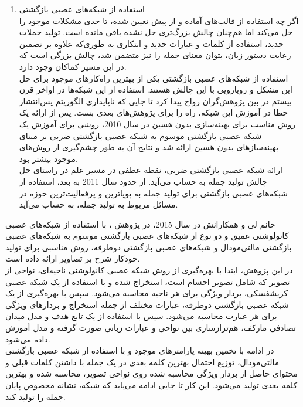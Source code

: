 \begin{enumerate}
\item استفاده از شبکه‌های عصبی بازگشتی
\\
اگر چه استفاده از قالب‌های آماده و از پیش تعیین شده، تا حدی مشکلات موجود را حل می‌کند اما هم‌چنان چالش بزرگ‌تری حل نشده باقی مانده است. تولید جملات جدید، استفاده از کلمات و عبارات جدید و ابتکاری به طوری‌که علاوه بر تضمین رعایت دستور زبان، بتوان معنای جمله را نیز متضمن شد، چالش بزرگی است که در این مسیر کماکان وجود دارد.
\\
استفاده از شبکه‌های عصبی بازگشتی یکی از بهترین راه‌کارهای موجود برای حل این مشکل و رویارویی با این چالش هستند. استفاده از این شبکه‌ها در اواخر قرن بیستم در بین پژوهش‌گران رواج پیدا کرد تا جایی که ناپایداری الگوریتم پس‌انتشار خطا در آموزش این شبکه، راه را برای پژوهش‌های بعدی بست. پس از ارائه یک روش مناسب برای بهینه‌سازی بدون هسین در سال 2010، روشی برای آموزش یک شبکه عصبی بازگشتی موسوم به شبکه عصبی بازگشتی ضربی بر مبنای بهینه‌سازهای بدون هسین ارائه شد و نتایج آن به طور چشم‌گیری از روش‌های موجود بیشتر بود.
\\
ارائه شبکه عصبی بازگشتی ضربی، نقطه عطفی در مسیر علم در راستای حل چالش تولید جمله به حساب می‌آید. از حدود سال 2011 به بعد، استفاده از شبکه‌های عصبی بازگشتی برای تولید جمله به پویاترین و پرفعالیت‌ترین حوزه در مسائل مربوط به تولید جمله، به حساب می‌آید.
\end{enumerate}

خانم لی و همکارانش در سال 2015، در پژوهش \cite{karpathy2015deep}، با استفاده از شبکه‌های عصبی کانولوشنی عمیق و دو نوع از شبکه‌های عصبی بازگشتی موسوم به شبکه‌های عصبی بازگشتی مالتی‌مودال و شبکه‌های عصبی بازگشتی دوطرفه، روش مناسبی برای تولید خودکار شرح بر تصاویر ارائه داده است.
\\
در این پژوهش، ابتدا با بهره‌گیری از روش شبکه عصبی کانولوشنی ناحیه‌ای، نواحی از تصویر که شامل تصویر اجسام است، استخراج شده و با استفاده از یک شبکه عصبی کریشفسکی، بردار ویژگی برای هر ناحیه محاسبه می‌شود. سپس با بهره‌گیری از یک شبکه عصبی بازگشتی دوطرفه، عبارات مختلف از جمله استخراج و بردارهای ویژگی برای هر عبارت محاسبه می‌شود. سپس با استفاده از یک تابع هدف و مدل میدان تصادفی مارکف، هم‌ترازسازی بین نواحی و عبارات زبانی صورت گرفته و مدل آموزش داده می‌شود.
\\
 در ادامه با تخمین بهینه پارامترهای موجود و با استفاده از شبکه عصبی بازگشتی مالتی‌مودال، توزیع احتمال بهترین کلمه بعدی در یک جمله با داشتن کلمات قبلی و محتوای حاصل از بردار ویژگی محاسبه شده روی نواحی تصویر، محاسبه شده و بهترین کلمه بعدی تولید می‌شود. این کار تا جایی ادامه می‌یابد که شبکه، نشانه مخصوص پایان جمله را تولید کند.
  